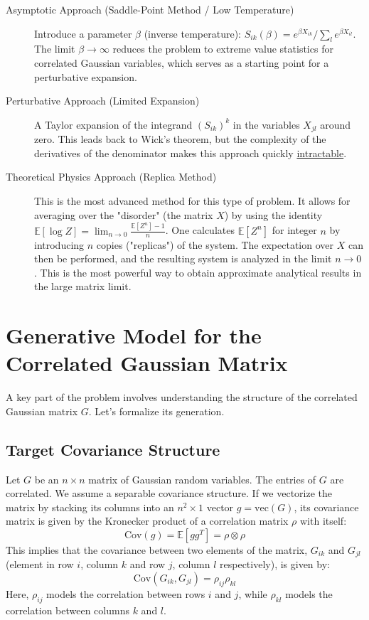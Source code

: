 \documentclass[12pt]{article}
\begin{document}
\begin{description}
    \item[Asymptotic Approach (Saddle-Point Method / Low Temperature)]
    Introduce a parameter $\beta$ (inverse temperature): $S_{ik}(\beta) = e^{\beta X_{ik}} / \sum_l e^{\beta X_{il}}$. The limit $\beta \to \infty$ reduces the problem to extreme value statistics for correlated Gaussian variables, which serves as a starting point for a perturbative expansion.

    \item[Perturbative Approach (Limited Expansion)]
    A Taylor expansion of the integrand $(S_{ik})^k$ in the variables $X_{jl}$ around zero. This leads back to Wick's theorem, but the complexity of the derivatives of the denominator makes this approach quickly \underline{intractable}.

    \item[Theoretical Physics Approach (Replica Method)]
    This is the most advanced method for this type of problem. It allows for averaging over the "disorder" (the matrix $X$) by using the identity $\mathbb{E}[\log Z] = \lim_{n \to 0} \frac{\mathbb{E}[Z^n] - 1}{n}$. One calculates $\mathbb{E}[Z^n]$ for integer $n$ by introducing $n$ copies ("replicas") of the system. The expectation over $X$ can then be performed, and the resulting system is analyzed in the limit $n \to 0$. This is the most powerful way to obtain approximate analytical results in the large matrix limit.
\end{description}

\section{Generative Model for the Correlated Gaussian Matrix}

A key part of the problem involves understanding the structure of the correlated Gaussian matrix $G$. Let's formalize its generation.

\subsection{Target Covariance Structure}
Let $G$ be an $n \times n$ matrix of Gaussian random variables. The entries of $G$ are correlated. We assume a separable covariance structure. If we vectorize the matrix by stacking its columns into an $n^2 \times 1$ vector $g = \text{vec}(G)$, its covariance matrix is given by the Kronecker product of a correlation matrix $\rho$ with itself:
\[
\text{Cov}(g) = \mathbb{E}[g g^T] = \rho \otimes \rho
\]
This implies that the covariance between two elements of the matrix, $G_{ik}$ and $G_{jl}$ (element in row $i$, column $k$ and row $j$, column $l$ respectively), is given by:
\[
\text{Cov}(G_{ik}, G_{jl}) = \rho_{ij} \rho_{kl}
\]
Here, $\rho_{ij}$ models the correlation between rows $i$ and $j$, while $\rho_{kl}$ models the correlation between columns $k$ and $l$.
\end{document}
